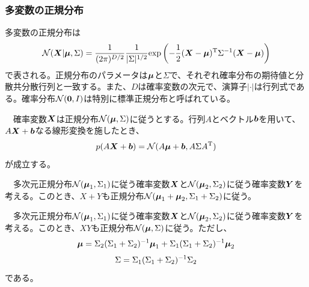 \documentclass[dvipdfmx, 9pt, a4paper]{jsarticle}
\newcommand{\bm}[1]{{\mbox{\boldmath $#1$}}}
\begin{document}
\subsubsection{多変数の正規分布}
多変数の正規分布は
\begin{equation}
\mathcal{N}(\bm X|\bm \mu, \Sigma)=\frac{1}{(2\pi)^{D/2}}\frac{1}{|\Sigma|^{1/2}}
{\rm exp}\left( -\frac{1}{2}(\bm X - \bm \mu)^{\rm T}\Sigma^{-1}(\bm X - \bm \mu) \right)
\end{equation}
で表される。正規分布のパラメータは$\bm \mu$と$\Sigma$で、それぞれ確率分布の期待値と分散共分散行列と一致する。また、$D$は確率変数の次元で、演算子$|\cdot|$は行列式である。確率分布$\mathcal{N}(\bm 0, I)$は特別に標準正規分布と呼ばれている。
\begin{tcolorbox}[title=正規分布の線形変換]
　確率変数$\bm X$は正規分布$\mathcal{N}(\bm \mu, \Sigma)$に従うとする。行列$A$とベクトル$\bm b$を用いて、$A\bm X+\bm b$なる線形変換を施したとき、
\begin{equation}
p(A\bm X+\bm b)=\mathcal{N}(A\bm \mu+\bm b, A\Sigma A^{\rm T}) \notag
\end{equation}
が成立する。
\end{tcolorbox}
\begin{tcolorbox}[title=正規分布の和]
　多次元正規分布$\mathcal{N}(\bm \mu_1, \Sigma_1)$に従う確率変数$\bm X$と$\mathcal{N}(\bm \mu_2, \Sigma_2)$に従う確率変数$\bm Y$を考える。このとき、$X+Y$も正規分布$\mathcal{N}(\bm \mu_1+\bm \mu_2, \Sigma_1+\Sigma_2)$に従う。
\end{tcolorbox}
\begin{tcolorbox}[title=正規分布の積]
　多次元正規分布$\mathcal{N}(\bm \mu_1, \Sigma_1)$に従う確率変数$\bm X$と$\mathcal{N}(\bm \mu_2, \Sigma_2)$に従う確率変数$\bm Y$を考える。このとき、$XY$も正規分布$\mathcal{N}(\bm \mu, \Sigma)$に従う。ただし、
\begin{equation}
\bm \mu=\Sigma_2(\Sigma_1+\Sigma_2)^{-1} \bm \mu_1+
\Sigma_1(\Sigma_1+\Sigma_2)^{-1} \bm \mu_2 \notag 
\end{equation}
\begin{equation}
\Sigma=\Sigma_1(\Sigma_1+\Sigma_2)^{-1}\Sigma_2 \notag
\end{equation}
である。
\end{tcolorbox}
\end{document}
